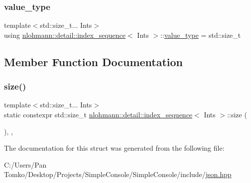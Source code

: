 \mbox{\label{structnlohmann_1_1detail_1_1index__sequence_a2eca43d08fc1eb68bd5fa75b6714d21d}} 
\subsubsection{\texorpdfstring{value\_type}{value\_type}}
{\footnotesize\ttfamily template$<$std\+::size\+\_\+t... Ints$>$ \\
using \mbox{\hyperlink{structnlohmann_1_1detail_1_1index__sequence}{nlohmann\+::detail\+::index\+\_\+sequence}}$<$ Ints $>$\+::\mbox{\hyperlink{structnlohmann_1_1detail_1_1index__sequence_a2eca43d08fc1eb68bd5fa75b6714d21d}{value\+\_\+type}} =  std\+::size\+\_\+t}



\subsection{Member Function Documentation}
\mbox{\label{structnlohmann_1_1detail_1_1index__sequence_a7ac529419787d775f52408135304b337}} 
\subsubsection{\texorpdfstring{size()}{size()}}
{\footnotesize\ttfamily template$<$std\+::size\+\_\+t... Ints$>$ \\
static constexpr std\+::size\+\_\+t \mbox{\hyperlink{structnlohmann_1_1detail_1_1index__sequence}{nlohmann\+::detail\+::index\+\_\+sequence}}$<$ Ints $>$\+::size (\begin{DoxyParamCaption}{ }\end{DoxyParamCaption})\hspace{0.3cm}{\ttfamily [inline]}, {\ttfamily [static]}, {\ttfamily [noexcept]}}



The documentation for this struct was generated from the following file\+:\begin{DoxyCompactItemize}
\item 
C\+:/\+Users/\+Pan Tomko/\+Desktop/\+Projects/\+Simple\+Console/\+Simple\+Console/include/\mbox{\hyperlink{json_8hpp}{json.\+hpp}}\end{DoxyCompactItemize}
